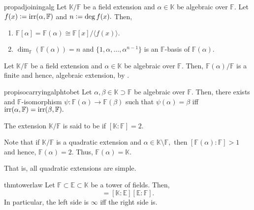 \begin{restatable}[]{prop}{adjoiningalg}
\label{prop:adjoiningalg}
    Let $\mathbb{K}/\mathbb{F}$ be a field extension and $\alpha \in \mathbb{K}$ be algebraic over $\mathbb{F}.$ Let $f(x) \vcentcolon= \operatorname{irr}(\alpha, \mathbb{F})$ and $n \vcentcolon= \deg f(x).$ Then,
    \begin{enumerate}
         \item $\mathbb{F}[\alpha] = \mathbb{F}(\alpha) \cong \mathbb{F}[x]/\langle f(x)\rangle.$
         \item $\dim_{\mathbb{F}}(\mathbb{F}(\alpha)) = n$ and $\{1, \alpha, \ldots, \alpha^{n - 1}\}$ is an $\mathbb{F}$-basis of $\mathbb{F}(\alpha).$ \hfill\hyperref[prop:adjoiningalg2]{\downsym}
     \end{enumerate} 
\end{restatable}

\begin{cor} \label{cor:adjoinalgisfin}
    Let $\mathbb{K}/\mathbb{F}$ be a field extension and $\alpha \in \mathbb{K}$ be algebraic over $\mathbb{F}.$ Then, $\mathbb{F}(\alpha)/\mathbb{F}$ is a finite and hence, algebraic extension, by .
\end{cor}

\begin{restatable}[]{prop}{isocarryingalphtobet}
\label{prop:isocarryingalphtobet}
    Let $\alpha, \beta \in \mathbb{K} \supset \mathbb{F}$ be algebraic over $\mathbb{F}.$ Then, there exists and $\mathbb{F}$-isomorphism $\psi : \mathbb{F}(\alpha) \to \mathbb{F}(\beta)$ such that $\psi(\alpha) = \beta$ iff $\operatorname{irr}(\alpha, \mathbb{F}) = \operatorname{irr}(\beta, \mathbb{F}).$ \hfill\hyperref[prop:isocarryingalphtobet2]{\downsym}
\end{restatable}

\begin{defn}%
    The extension $\mathbb{K}/\mathbb{F}$ is said to be  if $[\mathbb{K} : \mathbb{F}] = 2.$
\end{defn}

\begin{rem}
    Note that if $\mathbb{K}/\mathbb{F}$ is a quadratic extension and $\alpha \in \mathbb{K}\setminus\mathbb{F},$ then $[\mathbb{F}(\alpha) : \mathbb{F}] > 1$ and hence, $\mathbb{F}(\alpha) = 2.$ Thus, $\mathbb{F}(\alpha) = \mathbb{K}.$

    That is, all quadratic extensions are simple.
\end{rem}

\begin{restatable}{thm}{towerlaw}
\label{thm:towerlaw}
    Let $\mathbb{F} \subset \mathbb{E} \subset \mathbb{K}$ be a tower of fields. Then,
    \begin{equation*} 
        [\mathbb{K} : \mathbb{F}] = [\mathbb{K} : \mathbb{E}][\mathbb{E} : \mathbb{F}].
    \end{equation*}
    In particular, the left side is $\infty$ iff the right side is. \hfill\hyperref[thm:towerlaw2]{\downsym}
\end{restatable}

